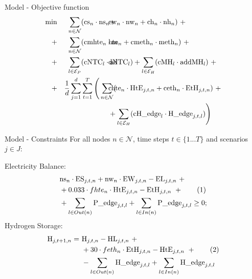\documentclass[pdf]{beamer}
\newcommand{\cN}{\mathcal{N}}
\newcommand{\cE}{\mathcal{E}}
\begin{document}
\begin{frame}{Model - Objective function}
  \small
  \begin{align*}
    \min 
    &&\sum_{n\in\cN}&(\text{cs}_n \cdot \text{ns}_n+\hspace{-2.3em}&&\text{cw}_n \cdot \text{nw}_n + \text{ch}_n \cdot \text{nh}_n )\ + \\
    +&& \sum_{n\in\cN}&(\text{cmhte}_n\cdot\text{m} \hspace{-2.3em}&& \text{hte}_n + \text{cmeth}_n\cdot \text{meth}_n) \ + \\
    +&& \sum_{l\in\cE_P}& (\text{cNTC}_l\cdot \text{ad}\hspace{-2.3em}&&\text{dNTC}_l) 
    + \sum_{l\in\cE_H} (\text{cMH}_l\cdot \text{addMH}_l) \ + \\   
    +&&\frac{1}{d}\sum_{j=1}^{d}&\sum_{t=1}^{T} \Bigg(\sum_{n\in\cN} (\hspace{-2.3em} &&
    \text{chte}_n \cdot \text{HtE}_{j,t,n} + \text{ceth}_n \cdot \text{EtH}_{j,t,n})\ + \\
    &&&\hspace{-3em}&&+\sum_{l\in\cE_H} (\text{cH\_edge}_l\cdot\text{H\_edge}_{j,t,l}) \Bigg)
\end{align*}

\end{frame}

  \begin{frame}{Model - Constraints}
    For all nodes $n\in\mathcal{N}$, time steps $t\in\{1...T\}$ and scenarios $j\in J$: \vspace{1em}
    
    Electricity Balance: \vspace{-.5em}
    \begin{align*}
       &\text{ns}_n \cdot \text{ES}_{j,t,n}+ \text{nw}_n \cdot \text{EW}_{j,t,n} - \text{EL}_{j,t,n} \ + \\
       &+ 0.033 \cdot fhte_n \cdot \text{HtE}_{j,t,n} - \text{EtH}_{j,t,n}\ + \stepcounter{equation}\tag{\theequation}\label{constr_P}\\
       &+ \sum_{l\in Out(n)}\text{P\_}\text{edge}_{j,t,l} + \sum_{l\in In(n)} \text{P\_edge}_{j,t,l} \ge 0;
    \end{align*} 
    Hydrogen Storage: \vspace{-.5em}
    \begin{align*}
       \text{H}_{j,t+1,n} =\ & \text{H}_{j,t,n} - \text{HL}_{j,t,n}\ +\\ 
      & + 30 \cdot feth_n \cdot \text{EtH}_{j,t,n} - \text{HtE}_{j,t,n} \ + \stepcounter{equation}\tag{\theequation}\label{constr_H}\\
      & - \sum_{l\in Out(n)}\text{H\_edge}_{j,t,l} + \sum_{l\in In(n)}\text{H\_edge}_{j,t,l}
    \end{align*}
\end{frame}
\end{document}
